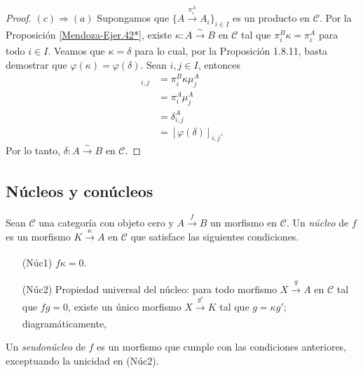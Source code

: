 \documentclass[tesis]{subfiles}
\begin{document}
\begin{proof}
    $(c)\Rightarrow(a)$ Supongamos que $\big\{A\xrightarrow[]{\pi_i^A} A_i\big\}_{i\in I}$ es un producto en $\mathscr{C}$. Por la Proposición \ref{Mendoza-Ejer.42*}, existe $\kappa:A\xrightarrow[]{\sim}B$ en $\mathscr{C}$ tal que $\pi_i^B\kappa = \pi_i^A$ para todo $i\in I$. Veamos que $\kappa=\delta$ para lo cual, por la Proposición 1.8.11, basta demostrar que $\varphi(\kappa) = \varphi(\delta)$. Sean $i,j\in I$, entonces
    \begin{align*}
        [\varphi(\kappa)]_{i,j} &= \pi_i^B\kappa\mu_j^A \\
                                 &= \pi_i^A\mu_j^A \\
                                 &= \delta_{i,j}^A \\
                                 &= [\varphi(\delta)]_{i,j}.
    \end{align*}
    Por lo tanto, $\delta:A\xrightarrow[]{\sim}B$ en $\mathscr{C}$.
\end{proof}

\subsection*{Núcleos y conúcleos} \label{Ssec: Núcleos y conúcleos}

\begin{Def}
    Sean $\mathscr{C}$ una categoría con objeto cero y $A\xrightarrow{f} B$ un morfismo en $\mathscr{C}$. Un \emph{núcleo} de $f$ es un morfismo $K\xrightarrow[]{\kappa} A$ en $\mathscr{C}$ que satisface las siguientes condiciones.
    \begin{itemize}
        \item[(Núc1)] $f\kappa = 0$.
         
        \item[(Núc2)] Propiedad universal del núcleo: para todo morfismo $X\xrightarrow{g} A$ en $\mathscr{C}$ tal que $fg=0$, existe un único morfismo $X\xrightarrow[]{g'} K$ tal que $g=\kappa g'$; diagramáticamente,
            \begin{center}
            \end{center}
    \end{itemize}
    Un \emph{seudonúcleo} de $f$ es un morfismo que cumple con las condiciones anteriores, exceptuando la unicidad en (Núc2).
\end{Def}
\end{document}
